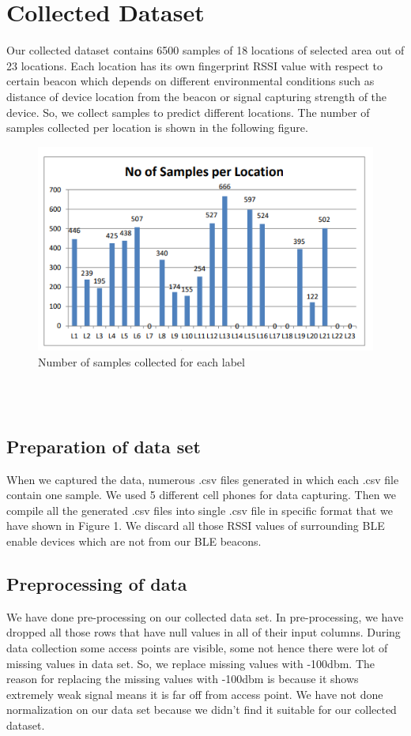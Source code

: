  \section {Collected Dataset}
Our collected dataset contains 6500 samples of 18 locations of selected area out of 23 locations. Each  location has its own fingerprint RSSI value with respect to certain beacon which depends on different environmental conditions such as distance of device location from the beacon or signal capturing strength of the device. So, we collect samples to predict different locations. The number of samples collected per location is shown in the following figure.
 \begin{figure}[h]
  		\centering
    		\includegraphics{./Figures/4}
\caption{Number of samples collected for each label}
\label{fig:4}
 		\end{figure}
\\\\
\subsection{Preparation of data set}
When we captured the data, numerous .csv files generated in which each .csv file contain one sample. We used 5 different cell phones for data capturing. Then we compile all the generated .csv files into single .csv file in specific format that we have shown in Figure 1. We discard all those RSSI values of surrounding BLE enable devices which are not from our BLE beacons.
\subsection{Preprocessing of data}
We have done pre-processing on our collected data set. In pre-processing, we have dropped all those rows that have null values in all of their input columns. During data collection some access points are visible, some not hence there were lot of missing values in data set. So, we replace missing values with -100dbm. The reason for replacing the missing values with -100dbm is because it shows extremely weak signal means it is far off from access point. We have not done normalization on our data set because we didn’t find it suitable for our collected dataset.


